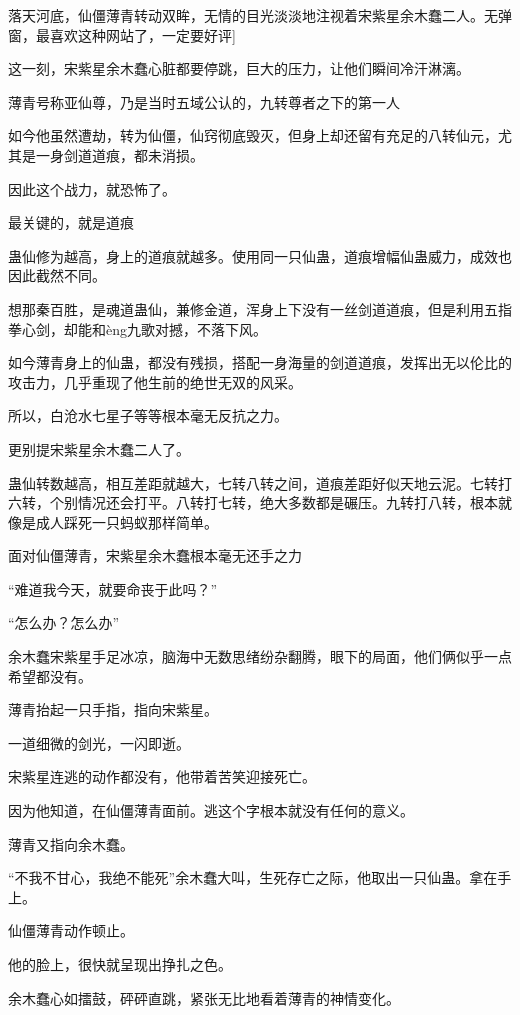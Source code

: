 
\begin{this_body}

落天河底，仙僵薄青转动双眸，无情的目光淡淡地注视着宋紫星余木蠢二人。无弹窗，最喜欢这种网站了，一定要好评]

这一刻，宋紫星余木蠢心脏都要停跳，巨大的压力，让他们瞬间冷汗淋漓。

薄青号称亚仙尊，乃是当时五域公认的，九转尊者之下的第一人

如今他虽然遭劫，转为仙僵，仙窍彻底毁灭，但身上却还留有充足的八转仙元，尤其是一身剑道道痕，都未消损。

因此这个战力，就恐怖了。

最关键的，就是道痕

蛊仙修为越高，身上的道痕就越多。使用同一只仙蛊，道痕增幅仙蛊威力，成效也因此截然不同。

想那秦百胜，是魂道蛊仙，兼修金道，浑身上下没有一丝剑道道痕，但是利用五指拳心剑，却能和èng九歌对撼，不落下风。

如今薄青身上的仙蛊，都没有残损，搭配一身海量的剑道道痕，发挥出无以伦比的攻击力，几乎重现了他生前的绝世无双的风采。

所以，白沧水七星子等等根本毫无反抗之力。

更别提宋紫星余木蠢二人了。

蛊仙转数越高，相互差距就越大，七转八转之间，道痕差距好似天地云泥。七转打六转，个别情况还会打平。八转打七转，绝大多数都是碾压。九转打八转，根本就像是成人踩死一只蚂蚁那样简单。

面对仙僵薄青，宋紫星余木蠢根本毫无还手之力

“难道我今天，就要命丧于此吗？”

“怎么办？怎么办”

余木蠢宋紫星手足冰凉，脑海中无数思绪纷杂翻腾，眼下的局面，他们俩似乎一点希望都没有。

薄青抬起一只手指，指向宋紫星。

一道细微的剑光，一闪即逝。

宋紫星连逃的动作都没有，他带着苦笑迎接死亡。

因为他知道，在仙僵薄青面前。逃这个字根本就没有任何的意义。

薄青又指向余木蠢。

“不我不甘心，我绝不能死”余木蠢大叫，生死存亡之际，他取出一只仙蛊。拿在手上。

仙僵薄青动作顿止。

他的脸上，很快就呈现出挣扎之色。

余木蠢心如擂鼓，砰砰直跳，紧张无比地看着薄青的神情变化。


\end{this_body}

